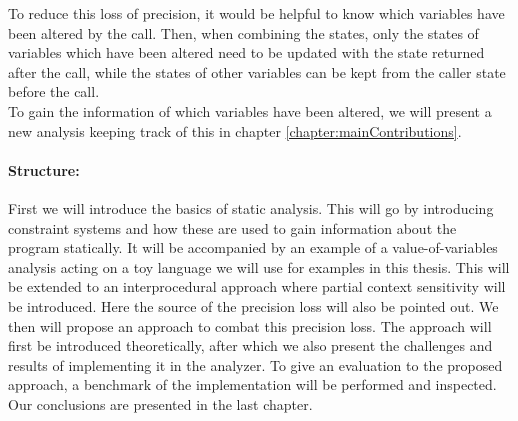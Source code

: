 To reduce this loss of precision, it would be helpful to know which variables have been altered by the call. Then, when combining the states, only the states of variables which have been altered need to be updated with the state returned after the call, while the states of other variables can be kept from the caller state before the call.\\
To gain the information of which variables have been altered, we will present a new analysis keeping track of this in chapter \ref{chapter:mainContributions}.

\paragraph{Structure:} %
First we will introduce the basics of static analysis. This will go by introducing constraint systems and how these are used to gain information about the program statically. It will be accompanied by an example of a value-of-variables analysis acting on a toy language we will use for examples in this thesis. This will be extended to an interprocedural approach where partial context sensitivity will be introduced. Here the source of the precision loss will also be pointed out. We then will propose an approach to combat this precision loss. The approach will first be introduced theoretically, after which we also present the challenges and results of implementing it in the \Gob analyzer. To give an evaluation to the proposed approach, a benchmark of the implementation will be performed and inspected. Our conclusions are presented in the last chapter.
